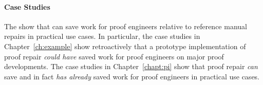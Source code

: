 \paragraph{Case Studies}
The  show that \sysnamelong can save work for proof engineers relative to 
reference manual repairs in practical use cases. %
In particular, the case studies in Chapter~\ref{ch:example} show retroactively that a prototype implementation of proof repair
 \textit{could have} saved work for proof engineers on major proof developments.
The case studies in Chapter~\ref{chapt:pi} show that proof repair  \textit{can} save
and in fact \textit{has already} saved work for proof engineers in practical use cases.


